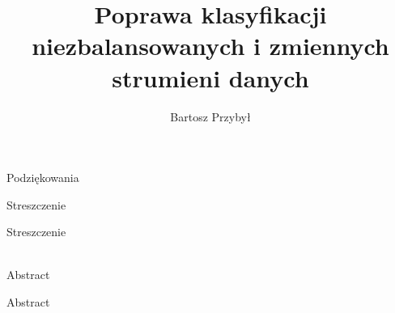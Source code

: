 \documentclass[polish,master,a4paper,oneside,11pt]{ppfcmthesis}
\author{%
   Bartosz Przybył \album{136785}}
\title{Poprawa klasyfikacji niezbalansowanych i zmiennych strumieni danych}
\begin{document}
\frontmatter\pagestyle{empty}%
\maketitle\cleardoublepage%

\newpage\null\thispagestyle{empty}\newpage
\begin{center}
    \huge Podziękowania
\end{center}

\newpage\null\thispagestyle{empty}\newpage
\newpage
\begin{center}
    \huge Streszczenie
\end{center}
Streszczenie\\\\

\begin{center}
    \huge Abstract
\end{center}
Abstract

\newpage\null\thispagestyle{empty}\newpage
\newpage
{}\pagestyle{ppfcmthesis}%
\tableofcontents* 
\cleardoublepage %


\mainmatter%









{\raggedright\sloppy\small}


\cleardoublepage\appendix%
\newpage



\ppcolophon
\end{document}
